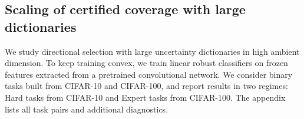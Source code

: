 \documentclass[accepted]{uai2026}
\theoremstyle{plain}
\theoremstyle{definition}
\theoremstyle{remark}
\begin{document}




\subsection{Scaling of certified coverage with large dictionaries}
\label{sec:scaling}

We study directional selection with large uncertainty dictionaries in high ambient dimension. To keep training convex, we train linear robust classifiers on frozen features extracted from a pretrained convolutional network. We consider binary tasks built from CIFAR-10 and CIFAR-100, and report results in two regimes: Hard tasks from CIFAR-10 and Expert tasks from CIFAR-100. The appendix lists all task pairs and additional diagnostics.
\end{document}
